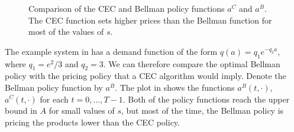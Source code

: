 \documentclass[main.tex]{subfiles}
\begin{document}
\begin{figure}[htbp]
  \caption{Comparison of the CEC and Bellman policy functions $a^C$ and
    $a^B$.
    The CEC function sets
    higher prices than the Bellman function for most of the values of $s$.
  }\label{fig:bellman_det_policy_difference}
\end{figure}

The example system in 
has a demand
function of the form $q(a)=q_1e^{-q_2a}$, where $q_1=e^2/3$ and
$q_2=3$. We can therefore compare the optimal Bellman policy with the
pricing policy that a CEC algorithm would imply.
Denote the Bellman policy function by $a^B$.
The plot in
 shows the functions
$a^B(t,\cdot)$, $a^C(t,\cdot)$ for each $t=0,\dots,T-1$.
Both of the policy functions reach the upper bound in $A$ for small values
of $s$, but most of the time, the Bellman policy is pricing the products
lower than the CEC policy.
\end{document}
